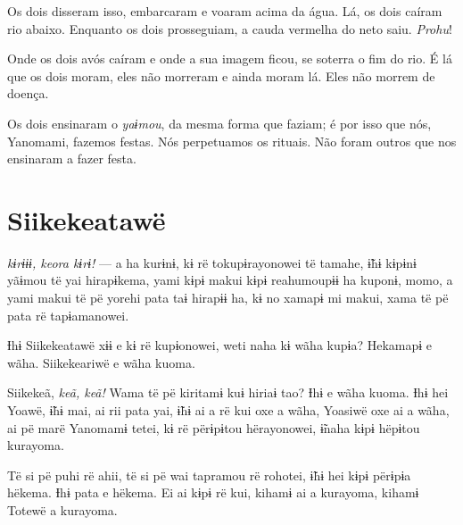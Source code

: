 Os dois disseram isso, embarcaram e voaram acima da água. Lá, os dois
caíram rio abaixo. Enquanto os dois prosseguiam, a cauda vermelha do
neto saiu. \textit{Prohu}! 


Onde os dois avós caíram e onde a sua imagem ficou, se soterra o fim do
rio. É lá que os dois moram, eles não morreram e ainda moram lá. Eles
não morrem de doença. 

Os dois ensinaram o \textit{yaɨmou}, da mesma forma que faziam; é por isso que nós, Yanomami, fazemos festas. Nós perpetuamos os rituais. Não foram outros que nos ensinaram a fazer festa.

\chapter{Siikekeatawë}
 
 \textit{kɨrɨɨɨ, keora kɨrɨ!} --- a ha kurɨnɨ, kɨ rë tokupɨrayonowei të
tamahe, ɨ̃hɨ kɨpɨnɨ yãɨmou të yai hirapɨkema, yami kɨpɨ makui kɨpɨ
reahumoupɨɨ ha kuponɨ, momo, a yami makui të pë yorehi pata taɨ hirapɨɨ
ha, kɨ no xamapɨ mi makui, xama të pë pata rë tapɨamanowei. 

Ɨhɨ Siikekeatawë xɨɨ e kɨ rë kupɨonowei, weti naha kɨ wãha kupɨa?
Hekamapɨ e wãha. Siikekeariwë e wãha kuoma. 

Siikekeã, \textit{keã, keã!} Wama të pë kiritamɨ kuɨ hiriaɨ tao? Ɨhɨ e wãha
kuoma. Ɨhɨ hei Yoawë, ɨ̃hɨ mai, ai rii pata yai, ɨ̃hɨ ai a rë kui oxe a
wãha, Yoasiwë oxe ai a wãha, ai pë marë Yanomamɨ tetei, kɨ rë përɨpɨtou
hërayonowei, ɨ̃naha kɨpɨ hëpɨtou kurayoma. 


Të si pë puhi rë ahii, të si pë wai tapramou rë rohotei, ɨ̃hɨ hei kɨpɨ
përɨpɨa hëkema. Ɨhɨ pata e hëkema. Ei ai kɨpɨ rë kui, kihamɨ ai a
kurayoma, kihamɨ Totewë a kurayoma. 

